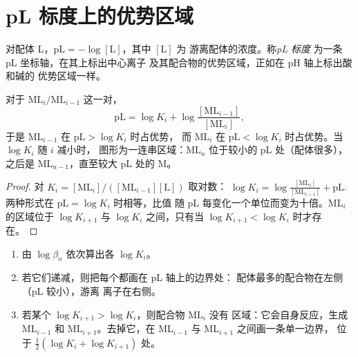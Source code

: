 \section{pL 标度上的优势区域}

\begin{definition}[pL 标度]\label{def:b1:complexation:pl-diagram}
对配体 L，$\mathrm{pL} = -\log[\mathrm{L}]$，其中 $[\mathrm{L}]$ 为
游离配体的浓度。称\emph{pL 标度}
为一条 pL 坐标轴，在其上标出中心离子
及其配合物的优势区域，正如在 pH 轴上标出酸和碱的
优势区域一样。
\end{definition}

\begin{proposition}[pL 中的边界]\label{prop:b1:complexation:pl-boundaries}
对于 $\mathrm{ML}_i/\mathrm{ML}_{i-1}$ 这一对，
\[
  \mathrm{pL} = \log K_i + \log\frac{[\mathrm{ML}_{i-1}]}{[\mathrm{ML}_i]} ,
\]
于是 $\mathrm{ML}_{i-1}$ 在 $\mathrm{pL} > \log K_i$ 时占优势，
而 $\mathrm{ML}_i$ 在 $\mathrm{pL} < \log K_i$ 时占优势。当 $\log K_i$ 随 $i$ 减小时，
图形为一连串区域：$\mathrm{ML}_n$ 位于较小的 pL 处（配体很多），
之后是 $\mathrm{ML}_{n-1}$，直至较大 pL 处的 M。
\end{proposition}

\begin{proof}
对 $K_i = [\mathrm{ML}_i]/([\mathrm{ML}_{i-1}][\mathrm{L}])$ 取对数：
$\log K_i = \log\frac{[\mathrm{ML}_i]}{[\mathrm{ML}_{i-1}]} + \mathrm{pL}$.
两种形式在 $\mathrm{pL} = \log K_i$ 时相等，比值
随 pL 每变化一个单位而变为十倍。$\mathrm{ML}_i$ 的区域位于
$\log K_{i+1}$ 与 $\log K_i$ 之间，只有当 $\log K_{i+1} < \log
K_i$ 时才存在。
\end{proof}

\begin{method}[绘制 pL 图]\label{met:b1:complexation:pl-diagram}
\begin{enumerate}
  \item 由 $\log\beta_n$ 依次算出各 $\log K_i$。
  \item 若它们递减，则把每个都画在 pL 轴上的边界处：
        配体最多的配合物在左侧（pL 较小），游离
        离子在右侧。
  \item 若某个 $\log K_{i+1} > \log K_i$，则配合物 $\mathrm{ML}_i$ 没有
        区域：它会自身反应，生成 $\mathrm{ML}_{i-1}$ 和
        $\mathrm{ML}_{i+1}$。去掉它，在
        $\mathrm{ML}_{i-1}$ 与 $\mathrm{ML}_{i+1}$ 之间画一条单一边界，
        位于 $\frac12(\log K_i + \log K_{i+1})$ 处。
\end{enumerate}
\end{method}

